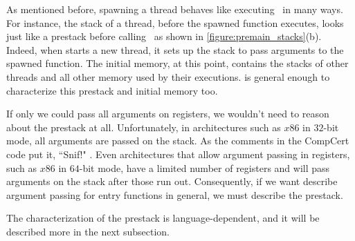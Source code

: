 %
%
%

As mentioned before, spawning a thread behaves like executing \main\ in many ways. For instance, the stack of a thread, before the spawned function executes, looks just like a prestack before calling \main\, as shown in \autoref{figure:premain_stacks}(b). Indeed, when  starts a new thread, it sets up the stack to pass arguments to the spawned function. The initial memory, at this point, contains the stacks of other threads and all other memory used by their executions.  is general enough to characterize this prestack and initial memory too.

If only we could pass all arguments on registers, we wouldn't need to reason about the prestack at all. 
Unfortunately, in architectures such as $x86$ in $32$-bit mode, all arguments are passed on the stack. As the comments in the CompCert code put it, ``Snif!" \cite{leroy19:compcert}. Even architectures that allow argument passing in registers, such as $x86$ in $64$-bit mode, have a limited number of registers and will pass arguments on the stack after those run out. Consequently, if we want describe argument passing for entry functions in general, we must describe the prestack.

The  characterization of the prestack is language-dependent, and it will be described more in the next subsection. %

